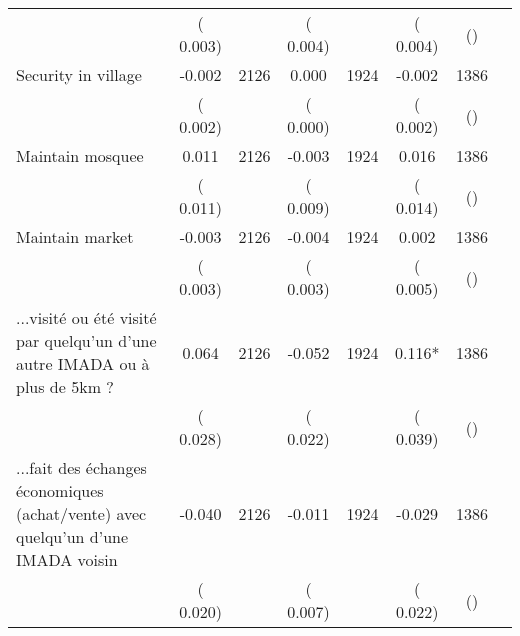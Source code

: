 \begin{tabular}{l*{6}{c}}
                       &       (       0.003)            &                               &       (       0.004)            &                               &       (       0.004)            &       () &                  \\
Security in village        &             -0.002      &       2126       &              0.000      &       1924       &             -0.002      &       1386  &  &              \\
                       &       (       0.002)            &                               &       (       0.000)            &                               &       (       0.002)            &       () &                  \\
Maintain mosquee        &              0.011      &       2126       &             -0.003      &       1924       &              0.016      &       1386  &  &              \\
                       &       (       0.011)            &                               &       (       0.009)            &                               &       (       0.014)            &       () &                  \\
Maintain market        &             -0.003      &       2126       &             -0.004      &       1924       &              0.002      &       1386  &  &              \\
                       &       (       0.003)            &                               &       (       0.003)            &                               &       (       0.005)            &       () &                  \\
...visité ou été visité par quelqu'un d'une autre IMADA ou à plus de 5km ?        &              0.064      &       2126       &             -0.052      &       1924       &              0.116*      &       1386  &  &              \\
                       &       (       0.028)            &                               &       (       0.022)            &                               &       (       0.039)            &       () &                  \\
...fait des échanges économiques (achat/vente) avec quelqu'un d'une IMADA voisin        &             -0.040      &       2126       &             -0.011      &       1924       &             -0.029      &       1386  &  &              \\
                       &       (       0.020)            &                               &       (       0.007)            &                               &       (       0.022)            &       () &                  \\

\end{tabular}
